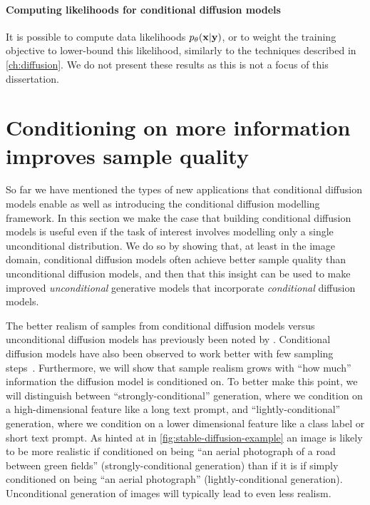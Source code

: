 \paragraph{Computing likelihoods for conditional diffusion models}
It is possible to compute data likelihoods $p_\theta({\mathbf{x}}|{\mathbf{y}})$, or to weight the training objective to lower-bound this likelihood, similarly to the techniques described in \cref{ch:diffusion}. We do not present these results as this is not a focus of this dissertation.

\section{Conditioning on more information improves sample quality} \label{sec:conditioning-on-more-improves-performance}

So far we have mentioned the types of new applications that conditional diffusion models enable as well as introducing the conditional diffusion modelling framework. In this section we make the case that building conditional diffusion models is useful even if the task of interest involves modelling only a single unconditional distribution. We do so by showing that, at least in the image domain, conditional diffusion models often achieve better sample quality than unconditional diffusion models, and then that this insight can be used to make improved \textit{unconditional} generative models that incorporate \textit{conditional} diffusion models.

The better realism of samples from conditional diffusion models versus unconditional diffusion models has previously been noted by \citet{ho2022classifier,bao2022conditional,hu2022self}. Conditional diffusion models have also been observed to work better with few sampling steps~\citep{meng2022distillation}. Furthermore, we will show that sample realism grows with ``how much'' information the diffusion model is conditioned on. To better make this point, we will distinguish between ``strongly-conditional'' generation, where we condition on a high-dimensional feature like a long text prompt, and ``lightly-conditional'' generation, where we condition on a lower dimensional feature like a class label or short text prompt.  As hinted at in \cref{fig:stable-diffusion-example} an image is likely to be more realistic if conditioned on being ``an aerial photograph of a road between green fields'' (strongly-conditional generation) than if it is if simply conditioned on being ``an aerial photograph'' (lightly-conditional generation). Unconditional generation of images will typically lead to even less realism.

